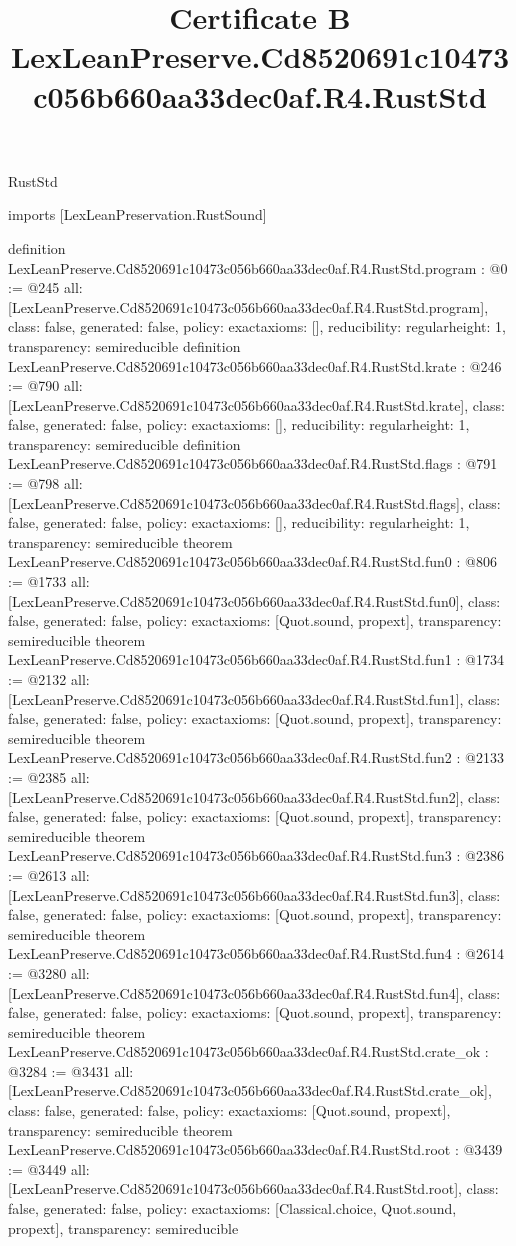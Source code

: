 \begin{lexlean}{RustStd}
\title{Certificate B LexLeanPreserve.Cd8520691c10473c056b660aa33dec0af.R4.RustStd}
\begin{coremodule}
imports [LexLeanPreservation.RustSound]

definition LexLeanPreserve.Cd8520691c10473c056b660aa33dec0af.R4.RustStd.program : @0 := @245 {
  all: [LexLeanPreserve.Cd8520691c10473c056b660aa33dec0af.R4.RustStd.program],
  class: false,
  generated: false,
  policy: exact{axioms: []},
  reducibility: regular{height: 1},
  transparency: semireducible
}
definition LexLeanPreserve.Cd8520691c10473c056b660aa33dec0af.R4.RustStd.krate : @246 := @790 {
  all: [LexLeanPreserve.Cd8520691c10473c056b660aa33dec0af.R4.RustStd.krate],
  class: false,
  generated: false,
  policy: exact{axioms: []},
  reducibility: regular{height: 1},
  transparency: semireducible
}
definition LexLeanPreserve.Cd8520691c10473c056b660aa33dec0af.R4.RustStd.flags : @791 := @798 {
  all: [LexLeanPreserve.Cd8520691c10473c056b660aa33dec0af.R4.RustStd.flags],
  class: false,
  generated: false,
  policy: exact{axioms: []},
  reducibility: regular{height: 1},
  transparency: semireducible
}
theorem LexLeanPreserve.Cd8520691c10473c056b660aa33dec0af.R4.RustStd.fun0 : @806 := @1733 {
  all: [LexLeanPreserve.Cd8520691c10473c056b660aa33dec0af.R4.RustStd.fun0],
  class: false,
  generated: false,
  policy: exact{axioms: [Quot.sound, propext]},
  transparency: semireducible
}
theorem LexLeanPreserve.Cd8520691c10473c056b660aa33dec0af.R4.RustStd.fun1 : @1734 := @2132 {
  all: [LexLeanPreserve.Cd8520691c10473c056b660aa33dec0af.R4.RustStd.fun1],
  class: false,
  generated: false,
  policy: exact{axioms: [Quot.sound, propext]},
  transparency: semireducible
}
theorem LexLeanPreserve.Cd8520691c10473c056b660aa33dec0af.R4.RustStd.fun2 : @2133 := @2385 {
  all: [LexLeanPreserve.Cd8520691c10473c056b660aa33dec0af.R4.RustStd.fun2],
  class: false,
  generated: false,
  policy: exact{axioms: [Quot.sound, propext]},
  transparency: semireducible
}
theorem LexLeanPreserve.Cd8520691c10473c056b660aa33dec0af.R4.RustStd.fun3 : @2386 := @2613 {
  all: [LexLeanPreserve.Cd8520691c10473c056b660aa33dec0af.R4.RustStd.fun3],
  class: false,
  generated: false,
  policy: exact{axioms: [Quot.sound, propext]},
  transparency: semireducible
}
theorem LexLeanPreserve.Cd8520691c10473c056b660aa33dec0af.R4.RustStd.fun4 : @2614 := @3280 {
  all: [LexLeanPreserve.Cd8520691c10473c056b660aa33dec0af.R4.RustStd.fun4],
  class: false,
  generated: false,
  policy: exact{axioms: [Quot.sound, propext]},
  transparency: semireducible
}
theorem LexLeanPreserve.Cd8520691c10473c056b660aa33dec0af.R4.RustStd.crate_ok : @3284 := @3431 {
  all: [LexLeanPreserve.Cd8520691c10473c056b660aa33dec0af.R4.RustStd.crate_ok],
  class: false,
  generated: false,
  policy: exact{axioms: [Quot.sound, propext]},
  transparency: semireducible
}
theorem LexLeanPreserve.Cd8520691c10473c056b660aa33dec0af.R4.RustStd.root : @3439 := @3449 {
  all: [LexLeanPreserve.Cd8520691c10473c056b660aa33dec0af.R4.RustStd.root],
  class: false,
  generated: false,
  policy: exact{axioms: [Classical.choice, Quot.sound, propext]},
  transparency: semireducible
}


\end{coremodule}
\end{lexlean}
